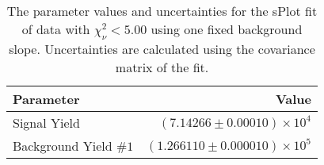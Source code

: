 
\begin{table}[ht]
    \begin{center}
        \begin{tabular}{lr}\toprule
            Parameter & Value \\\midrule
            Signal Yield & $(7.14266 \pm 0.00010) \times 10^{4}$ \\
            Background Yield $\#1$ & $(1.266110 \pm 0.000010) \times 10^{5}$ \\\bottomrule
        \end{tabular}
        \caption{The parameter values and uncertainties for the sPlot fit of data with $\chi^2_\nu < 5.00$ using one fixed background slope. Uncertainties are calculated using the covariance matrix of the fit.}\label{tab:splot-fit-results-chisqdof-5.00-fixed-1}
    \end{center}
\end{table}
